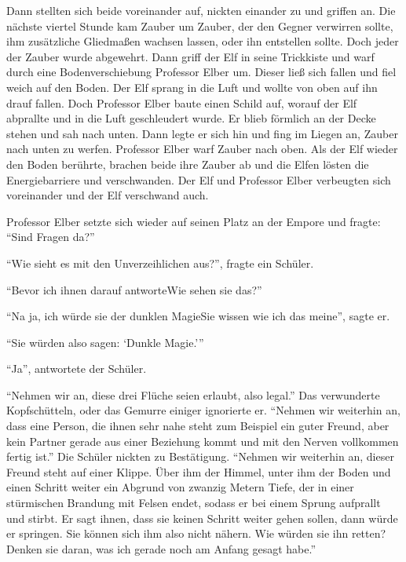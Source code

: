 Dann stellten sich beide voreinander auf, nickten einander zu und griffen an. Die nächste viertel Stunde kam Zauber um Zauber, der den Gegner verwirren sollte, ihm zusätzliche Gliedmaßen wachsen lassen, oder ihn entstellen sollte. Doch jeder der Zauber wurde abgewehrt. Dann griff der Elf in seine Trickkiste und warf durch eine Bodenverschiebung Professor Elber um. Dieser ließ sich fallen und fiel weich auf den Boden. Der Elf sprang in die Luft und wollte von oben auf ihn drauf fallen. Doch Professor Elber baute einen Schild auf, worauf der Elf abprallte und in die Luft geschleudert wurde. Er blieb förmlich an der Decke stehen und sah nach unten. Dann legte er sich hin und fing im Liegen an, Zauber nach unten zu werfen. Professor Elber warf Zauber nach oben. Als der Elf wieder den Boden berührte, brachen beide ihre Zauber ab und die Elfen lösten die Energiebarriere und verschwanden. Der Elf und Professor Elber verbeugten sich voreinander und der Elf verschwand auch.

Professor Elber setzte sich wieder auf seinen Platz an der Empore und fragte: \enquote{Sind Fragen da?}

\enquote{Wie sieht es mit den Unverzeihlichen aus?}, fragte ein Schüler.

\enquote{Bevor ich ihnen darauf antworte\abs Wie sehen sie das?}

\enquote{Na ja, ich würde sie der dunklen Magie\abs Sie wissen wie ich das meine}, sagte er.

\enquote{Sie würden also sagen: \enquote{Dunkle Magie.}}

\enquote{Ja}, antwortete der Schüler.

\enquote{Nehmen wir an, diese drei Flüche seien erlaubt, also legal.} Das verwunderte Kopfschütteln, oder das Gemurre einiger ignorierte er. \enquote{Nehmen wir weiterhin an, dass eine Person, die ihnen sehr nahe steht \gst zum Beispiel ein guter Freund, aber kein Partner \gst gerade aus einer Beziehung kommt und mit den Nerven vollkommen fertig ist.} Die Schüler nickten zu Bestätigung. \enquote{Nehmen wir weiterhin an, dieser Freund steht auf einer Klippe. Über ihm der Himmel, unter ihm der Boden und einen Schritt weiter ein Abgrund von zwanzig Metern Tiefe, der in einer stürmischen Brandung mit Felsen endet, sodass er bei einem Sprung aufprallt und stirbt. Er sagt ihnen, dass sie keinen Schritt weiter gehen sollen, dann würde er springen. Sie können sich ihm also nicht nähern. \gst Wie würden sie ihn retten? \gst Denken sie daran, was ich gerade noch am Anfang gesagt habe.}

